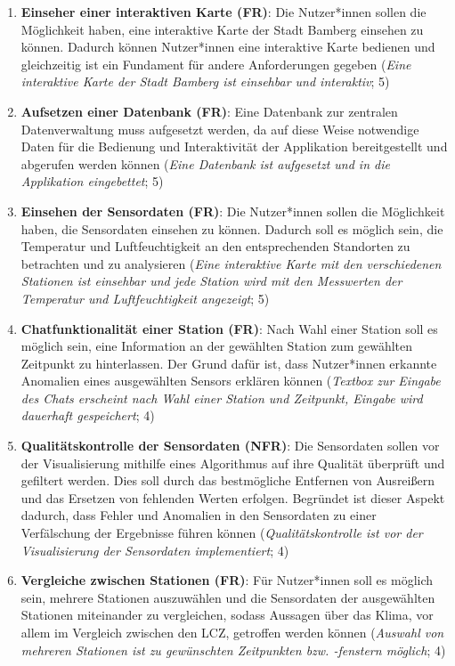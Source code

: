 \begin{enumerate}
    \item \textbf{Einseher einer interaktiven Karte (\ac{FR})}: Die Nutzer*innen sollen die Möglichkeit haben, eine interaktive Karte der Stadt Bamberg einsehen zu können. Dadurch können Nutzer*innen eine interaktive Karte bedienen und gleichzeitig ist ein Fundament für andere Anforderungen gegeben (\textit{Eine interaktive Karte der Stadt Bamberg ist einsehbar und interaktiv}; 5)
    \item \textbf{Aufsetzen einer Datenbank (\ac{FR})}: Eine Datenbank zur zentralen Datenverwaltung muss aufgesetzt werden, da auf diese Weise notwendige Daten für die Bedienung und Interaktivität der Applikation bereitgestellt und  abgerufen werden können (\textit{Eine Datenbank ist aufgesetzt und in die Applikation eingebettet}; 5)
    \item \textbf{Einsehen der Sensordaten (\ac{FR})}: Die Nutzer*innen sollen die Möglichkeit haben, die Sensordaten einsehen zu können. Dadurch soll es möglich sein, die Temperatur und Luftfeuchtigkeit an den entsprechenden Standorten zu betrachten und zu analysieren (\textit{Eine interaktive Karte mit den verschiedenen Stationen ist einsehbar und jede Station wird mit den Messwerten der Temperatur und Luftfeuchtigkeit angezeigt}; 5)
    \item \textbf{Chatfunktionalität einer Station (\ac{FR})}: Nach Wahl einer Station soll es möglich sein, eine Information an der gewählten Station zum gewählten Zeitpunkt zu hinterlassen. Der Grund dafür ist, dass Nutzer*innen erkannte Anomalien eines ausgewählten Sensors erklären können (\textit{Textbox zur Eingabe des Chats erscheint nach Wahl einer Station und Zeitpunkt, Eingabe wird dauerhaft gespeichert}; 4)
    \item \textbf{Qualitätskontrolle der Sensordaten (\ac{NFR})}: Die Sensordaten sollen vor der Visualisierung mithilfe eines Algorithmus auf ihre Qualität überprüft und gefiltert werden. Dies soll durch das bestmögliche Entfernen von Ausreißern und das Ersetzen von fehlenden Werten erfolgen. Begründet ist dieser Aspekt dadurch, dass Fehler und Anomalien in den Sensordaten zu einer Verfälschung der Ergebnisse führen können (\textit{Qualitätskontrolle ist vor der Visualisierung der Sensordaten implementiert}; 4)
    \item \textbf{Vergleiche zwischen Stationen (\ac{FR})}: Für Nutzer*innen soll es möglich sein, mehrere Stationen auszuwählen und die Sensordaten der ausgewählten Stationen miteinander zu vergleichen, sodass Aussagen über das Klima, vor allem im Vergleich zwischen den \ac{LCZ}, getroffen werden können (\textit{Auswahl von mehreren Stationen ist zu gewünschten Zeitpunkten bzw. -fenstern möglich}; 4)

\end{enumerate}
